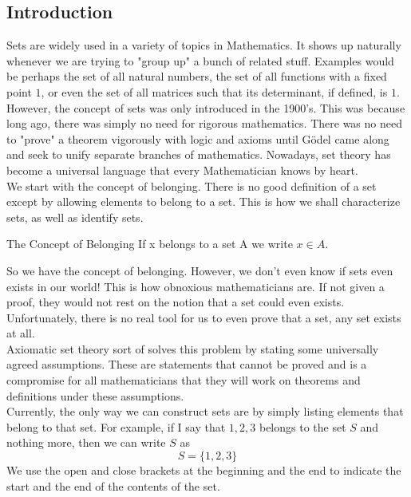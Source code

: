 \documentclass[a4paper]{article}
\begin{document}
\subsection{Introduction}
Sets are widely used in a variety of topics in Mathematics. It shows up naturally whenever we are trying to "group up" a bunch of related stuff. Examples would be perhaps the set of all natural numbers, the set of all functions with a fixed point $1$, or even the set of all matrices such that its determinant, if defined, is $1$. \\

However, the concept of sets was only introduced in the 1900's. This was because long ago, there was simply no need for rigorous mathematics. There was no need to "prove" a theorem vigorously with logic and axioms until Gödel came along and seek to unify separate branches of mathematics. Nowadays, set theory has become a universal language that every Mathematician knows by heart. \\

We start with the concept of belonging. There is no good definition of a set except by allowing elements to belong to a set. This is how we shall characterize sets, as well as identify sets. 
\begin{defn}{The Concept of Belonging}{} If x belongs to a set A we write $x\in A$. 
\end{defn}

So we have the concept of belonging. However, we don't even know if sets even exists in our world! This is how obnoxious mathematicians are. If not given a proof, they would not rest on the notion that a set could even exists. Unfortunately, there is no real tool for us to even prove that a set, any set exists at all. \\

Axiomatic set theory sort of solves this problem by stating some universally agreed assumptions. These are statements that cannot be proved and is a compromise for all mathematicians that they will work on theorems and definitions under these assumptions. \\

Currently, the only way we can construct sets are by simply listing elements that belong to that set. For example, if I say that $1,2,3$ belongs to the set $S$ and nothing more, then we can write $S$ as $$S=\{1,2,3\}$$ We use the open and close brackets at the beginning and the end to indicate the start and the end of the contents of the set. 
\end{document}
